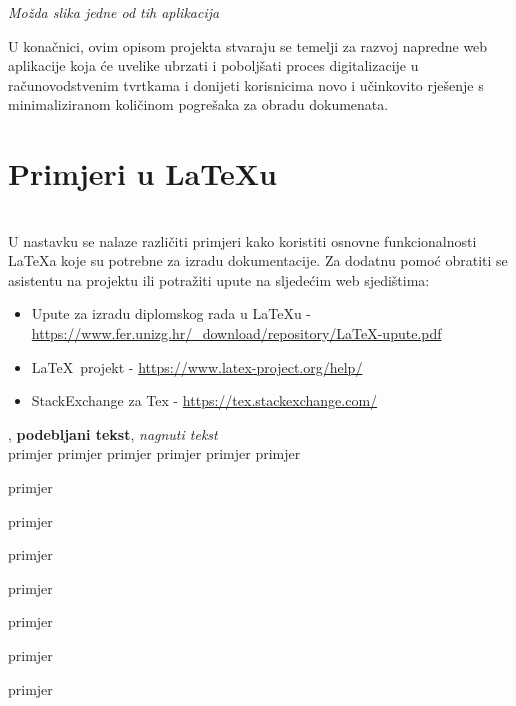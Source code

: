 		\textit{Možda slika jedne od tih aplikacija}

		U konačnici, ovim opisom projekta stvaraju se temelji za razvoj napredne web aplikacije koja će uvelike ubrzati i poboljšati proces digitalizacije u računovodstvenim tvrtkama i donijeti korisnicima novo i učinkovito rješenje s minimaliziranom količinom pogrešaka za obradu dokumenata.
		\eject
		
		\section{Primjeri u \LaTeX u}
		
		\\

		U nastavku se nalaze različiti primjeri kako koristiti osnovne funkcionalnosti \LaTeX a koje su potrebne za izradu dokumentacije. Za dodatnu pomoć obratiti se asistentu na projektu ili potražiti upute na sljedećim web sjedištima:
		\begin{itemize}
			\item Upute za izradu diplomskog rada u \LaTeX u - \url{https://www.fer.unizg.hr/_download/repository/LaTeX-upute.pdf}
			\item \LaTeX\ projekt - \url{https://www.latex-project.org/help/}
			\item StackExchange za Tex - \url{https://tex.stackexchange.com/}\\
		
		\end{itemize} 	


		
		\noindent {}, \textbf{podebljani tekst}, 	\textit{nagnuti tekst}\\
		\noindent \normalsize primjer \large primjer \Large primjer \LARGE {primjer} \huge {primjer} \Huge primjer \normalsize
				
		\begin{packed_item}
			
			\item  primjer
			\item  primjer
			\item  primjer
			\item[] \begin{packed_enum}
				\item primjer
				\item[] \begin{packed_enum}
					\item[1.a] primjer
					\item[b] primjer
				\end{packed_enum}
				\item primjer
			\end{packed_enum}
			
		\end{packed_item}
		
